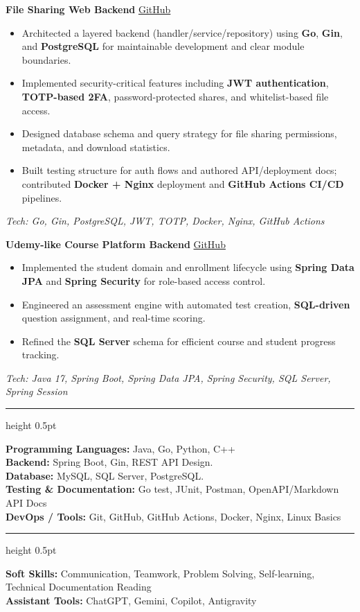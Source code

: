 \documentclass[11pt,a4paper]{article}
\newcommand{\cvitem}[1]{\item \normalsize #1}
\newcommand{\kw}[1]{\textbf{#1}}
\newcommand{\cvsection}[1]{
  \vspace{2pt}
  \noindent{\large\bfseries\scshape #1}\hspace{0.45em}\textcolor{black!55}{\leaders\hrule height 0.5pt\hfill}\par\vspace{1pt}
}
\newcommand{\projectheader}[2]{
  \vspace{2pt}
  \noindent\textcolor{accent}{\textbf{#1}} \hfill {\footnotesize\href{#2}{GitHub}}\par
  \vspace{1pt}
}
\begin{document}
\projectheader{File Sharing Web Backend}{https://github.com/HaiXon231/file-sharing-web-backend2}
\begin{itemize}[leftmargin=*,itemsep=1pt,topsep=0pt,parsep=0pt,partopsep=0pt]
  \cvitem{Architected a layered backend (handler/service/repository) using \kw{Go}, \kw{Gin}, and \kw{PostgreSQL} for maintainable development and clear module boundaries.}
  \cvitem{Implemented security-critical features including \kw{JWT authentication}, \kw{TOTP-based 2FA}, password-protected shares, and whitelist-based file access.}
  \cvitem{Designed database schema and query strategy for file sharing permissions, metadata, and download statistics.}
  \cvitem{Built testing structure for auth flows and authored API/deployment docs; contributed \kw{Docker + Nginx} deployment and \kw{GitHub Actions CI/CD} pipelines.}
\end{itemize}
\normalsize \textit{Tech: Go, Gin, PostgreSQL, JWT, TOTP, Docker, Nginx, GitHub Actions}

\projectheader{Udemy-like Course Platform Backend}{https://github.com/HaiXon231/udemy}
\begin{itemize}[leftmargin=*,itemsep=1pt,topsep=0pt,parsep=0pt,partopsep=0pt]
  \cvitem{Implemented the student domain and enrollment lifecycle using \kw{Spring Data JPA} and \kw{Spring Security} for role-based access control.}
  \cvitem{Engineered an assessment engine with automated test creation, \kw{SQL-driven} question assignment, and real-time scoring.}
  \cvitem{Refined the \kw{SQL Server} schema for efficient course and student progress tracking.}
\end{itemize}
\normalsize \textit{Tech: Java 17, Spring Boot, Spring Data JPA, Spring Security, SQL Server, Spring Session}

\cvsection{TECHNICAL SKILLS}
\normalsize
\textbf{Programming Languages:} Java, Go, Python, C++ \\
\textbf{Backend:} Spring Boot, Gin, REST API Design. \\
\textbf{Database:} MySQL, SQL Server, PostgreSQL. \\
\textbf{Testing \& Documentation:} Go test, JUnit, Postman, OpenAPI/Markdown API Docs \\
\textbf{DevOps / Tools:} Git, GitHub, GitHub Actions, Docker, Nginx, Linux Basics 

\cvsection{OTHER SKILLS}
\normalsize
\textbf{Soft Skills:} Communication, Teamwork, Problem Solving, Self-learning, Technical Documentation Reading \\
\textbf{Assistant Tools:} ChatGPT, Gemini, Copilot, Antigravity
\end{document}
